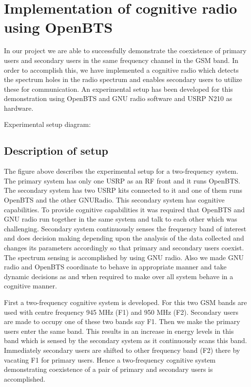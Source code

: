 \chapter{Implementation of cognitive radio using OpenBTS}

In our project we are able to successfully demonstrate the
coexistence of primary users and secondary users in the same 
frequency channel in the
GSM band. In order to accomplish this, we have implemented
a cognitive radio which detects the spectrum holes in the
radio spectrum and enables secondary users to utilize these 
for communication. An experimental setup has been  
developed for this demonstration using OpenBTS and GNU 
radio software and USRP N210 as hardware.

Experimental setup diagram:


\section{Description of setup}
The figure above describes the experimental setup for a
two-frequency system. The primary system has only
one USRP as an RF front and it runs OpenBTS. The 
secondary system has two USRP kits connected to it and one of them
runs OpenBTS and the other GNURadio.
This secondary system has cognitive capabilities. 
To provide cognitive capabilities it was required that 
OpenBTS and GNU radio run together in the same system and 
talk to each other which was challenging. Secondary system
continuously senses the frequency band of interest and does 
decision making depending upon the analysis of the data 
collected and changes its parameters accordingly so that 
primary and secondary users coexist. The spectrum sensing 
is accomplished by using GNU radio. Also we made GNU radio 
and OpenBTS coordinate to behave in appropriate manner and 
take dynamic decisions as and when required to make over all
system behave in a cognitive manner.

First a two-frequency cognitive system is developed.
For this two GSM bands are used with centre frequency
945 MHz (F1) and 950 MHz (F2). Secondary users are made to occupy
one of these two bands say F1. Then we make the primary users 
enter the same band. This results in an increase in energy 
levels in this band which is sensed by the secondary system 
as it continuously scans this band. Immediately
secondary users are shifted to other frequency band (F2)
there by vacating F1 for primary users. Hence a two-frequency
cognitive system demonstrating coexistence of a pair of
primary and secondary users is accomplished. 

